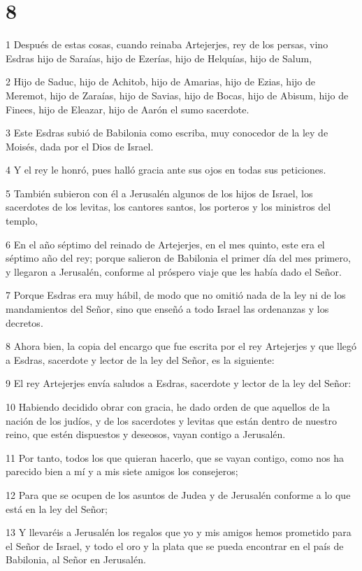 \chapter{8}

\par 1 Después de estas cosas, cuando reinaba Artejerjes, rey de los persas, vino Esdras hijo de Saraías, hijo de Ezerías, hijo de Helquías, hijo de Salum,
\par 2 Hijo de Saduc, hijo de Achitob, hijo de Amarias, hijo de Ezias, hijo de Meremot, hijo de Zaraías, hijo de Savias, hijo de Bocas, hijo de Abisum, hijo de Finees, hijo de Eleazar, hijo de Aarón el sumo sacerdote.
\par 3 Este Esdras subió de Babilonia como escriba, muy conocedor de la ley de Moisés, dada por el Dios de Israel.
\par 4 Y el rey le honró, pues halló gracia ante sus ojos en todas sus peticiones.
\par 5 También subieron con él a Jerusalén algunos de los hijos de Israel, los sacerdotes de los levitas, los cantores santos, los porteros y los ministros del templo,
\par 6 En el año séptimo del reinado de Artejerjes, en el mes quinto, este era el séptimo año del rey; porque salieron de Babilonia el primer día del mes primero, y llegaron a Jerusalén, conforme al próspero viaje que les había dado el Señor.
\par 7 Porque Esdras era muy hábil, de modo que no omitió nada de la ley ni de los mandamientos del Señor, sino que enseñó a todo Israel las ordenanzas y los decretos.
\par 8 Ahora bien, la copia del encargo que fue escrita por el rey Artejerjes y que llegó a Esdras, sacerdote y lector de la ley del Señor, es la siguiente:
\par 9 El rey Artejerjes envía saludos a Esdras, sacerdote y lector de la ley del Señor:
\par 10 Habiendo decidido obrar con gracia, he dado orden de que aquellos de la nación de los judíos, y de los sacerdotes y levitas que están dentro de nuestro reino, que estén dispuestos y deseosos, vayan contigo a Jerusalén.
\par 11 Por tanto, todos los que quieran hacerlo, que se vayan contigo, como nos ha parecido bien a mí y a mis siete amigos los consejeros;
\par 12 Para que se ocupen de los asuntos de Judea y de Jerusalén conforme a lo que está en la ley del Señor;
\par 13 Y llevaréis a Jerusalén los regalos que yo y mis amigos hemos prometido para el Señor de Israel, y todo el oro y la plata que se pueda encontrar en el país de Babilonia, al Señor en Jerusalén.
